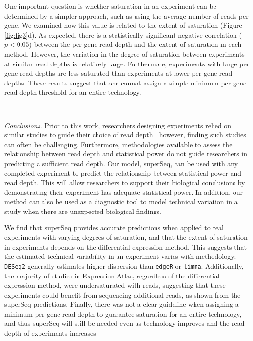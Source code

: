 \documentclass[11pt]{article}
\begin{document}
One important question is whether saturation in an experiment can be determined by a simpler approach, such as using the average number of reads per gene. We examined how this value is related to the extent of saturation (Figure \ref{fig:fig3}d). As expected, there is a statistically significant negative correlation ($p < 0.05$) between the per gene read depth and the extent of saturation in each method. However, the variation in the degree of saturation between experiments at similar read depths is relatively large. Furthermore, experiments with large per gene read depths are less saturated than experiments at lower per gene read depths. These results suggest that one cannot assign a simple minimum per gene read depth threshold for an entire technology. 

\  

\noindent \textit{Conclusions.} Prior to this work, researchers designing experiments relied on similar studies to guide their choice of read depth \cite{Liu:2014br,Wang:2011fs,Daines:2011id,Black:2014ko}; however, finding such studies can often be challenging. Furthermore, methodologies available to assess the relationship between read depth and statistical power do not guide researchers in predicting a sufficient read depth. Our model, superSeq, can be used with any completed experiment to predict the relationship between statistical power and read depth. This will allow researchers to support their biological conclusions by demonstrating their experiment has adequate statistical power. In addition, our method can also be used as a diagnostic tool to model technical variation in a study when there are unexpected biological findings. 

We find that superSeq provides accurate predictions when applied to real experiments with varying degrees of saturation, and that the extent of saturation in experiments depends on the differential expression method. This suggests that the estimated technical variability in an experiment varies with methodology: {\tt DESeq2} generally estimates higher dispersion than {\tt edgeR} or {\tt limma}. Additionally, the majority of studies in Expression Atlas, regardless of the differential expression method, were undersaturated with reads, suggesting that these experiments could benefit from sequencing additional reads, as shown from the superSeq predictions. Finally, there was not a clear guideline when assigning a minimum per gene read depth to guarantee saturation for an entire technology, and thus superSeq will still be needed even as technology improves and the read depth of experiments increases. 
\end{document}
